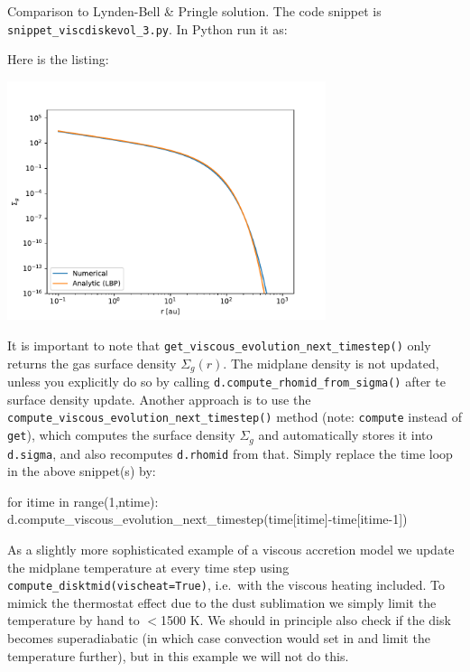 \documentclass{book}
\newcommand{\code}[1]{{\small\tt #1}}
\begin{document}
Comparison to Lynden-Bell \& Pringle solution.
The code snippet is
\code{snippet\_viscdiskevol\_3.py}. In Python run it as:
\begin{codebox}
\end{codebox}
Here is the listing:

\centerline{\includegraphics[width=0.7\textwidth]{../snippets/fig_snippet_viscdiskevol_3_1.pdf}}

It is important to note that \code{get\_viscous\_evolution\_next\_timestep()}
only returns the gas surface density $\Sigma_g(r)$. The midplane density is not
updated, unless you explicitly do so by calling
\code{d.compute\_rhomid\_from\_sigma()} after te surface density update.
Another approach is to use the \code{compute\_viscous\_evolution\_next\_timestep()}
method (note: \code{compute} instead of \code{get}), which computes the
surface density $\Sigma_g$ and automatically stores it into \code{d.sigma},
and also recomputes \code{d.rhomid} from that. Simply replace the time loop in
the above snippet(s) by:
\begin{codebox}
for itime in range(1,ntime):
   d.compute_viscous_evolution_next_timestep(time[itime]-time[itime-1])
\end{codebox}

As a slightly more sophisticated example of a viscous accretion model
we update the midplane temperature at every time step using
\code{compute\_disktmid(vischeat=True)}, i.e.\ with the viscous
heating included. To mimick the thermostat effect due to the
dust sublimation we simply limit the temperature by hand to $<$1500 K.
We should in principle also check if the disk becomes superadiabatic
(in which case convection would set in and limit the temperature
further), but in this example we will not do this.
\end{document}
